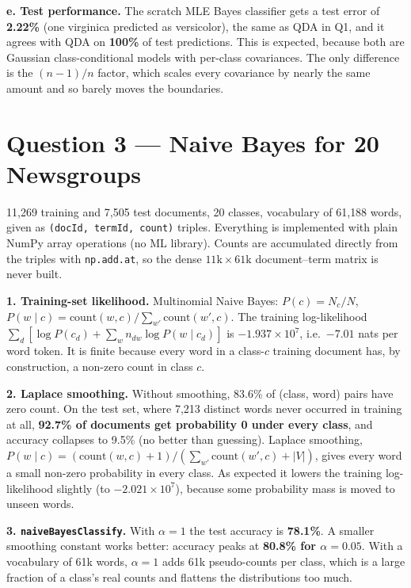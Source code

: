\documentclass[11pt]{article}
\begin{document}
\textbf{e. Test performance.} The scratch MLE Bayes classifier gets a test error of \textbf{2.22\%} (one virginica predicted as
versicolor), the same as QDA in Q1, and it agrees with QDA on \textbf{100\%} of test predictions. This is expected, because both are
Gaussian class-conditional models with per-class covariances. The only difference is the $(n-1)/n$ factor, which scales every covariance by
nearly the same amount and so barely moves the boundaries.

\section*{Question 3 --- Naive Bayes for 20 Newsgroups}

11{,}269 training and 7{,}505 test documents, 20 classes, vocabulary of 61{,}188 words, given as \texttt{(docId, termId, count)} triples.
Everything is implemented with plain NumPy array operations (no ML library). Counts are accumulated directly from the
triples with \texttt{np.add.at}, so the dense $11\text{k}\times61\text{k}$ document--term matrix is never built.

\textbf{1. Training-set likelihood.} Multinomial Naive Bayes: $P(c)=N_c/N$, $P(w\mid c)=\text{count}(w,c)/\sum_{w'}\text{count}(w',c)$.
The training log-likelihood $\sum_d[\log P(c_d)+\sum_w n_{dw}\log P(w\mid c_d)]$ is \textbf{$-1.937\times10^{7}$}, i.e.\ $-7.01$ nats per word token.
It is finite because every word in a class-$c$ training document has, by construction, a non-zero count in class $c$.

\textbf{2. Laplace smoothing.} Without smoothing, 83.6\% of (class, word) pairs have zero count. On the test set, where 7{,}213 distinct
words never occurred in training at all, \textbf{92.7\% of documents get probability 0 under every class}, and accuracy collapses to 9.5\%
(no better than guessing). Laplace smoothing, $P(w\mid c) = (\text{count}(w,c)+1)/(\sum_{w'}\text{count}(w',c)+|V|)$, gives every word a
small non-zero probability in every class. As expected it lowers the training log-likelihood slightly (to $-2.021\times10^{7}$),
because some probability mass is moved to unseen words.

\textbf{3. \texttt{naiveBayesClassify}.} With $\alpha=1$ the test accuracy is \textbf{78.1\%}. A smaller smoothing constant works better:
accuracy peaks at \textbf{80.8\% for $\alpha=0.05$}. With a vocabulary of 61k words, $\alpha=1$ adds 61k pseudo-counts per class,
which is a large fraction of a class's real counts and flattens the distributions too much.
\end{document}
